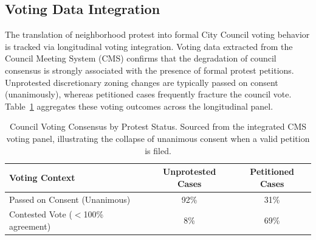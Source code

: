 \subsection{Voting Data Integration}
\noindent The translation of neighborhood protest into formal City Council voting behavior is tracked via longitudinal voting integration. Voting data extracted from the Council Meeting System (CMS) confirms that the degradation of council consensus is strongly associated with the presence of formal protest petitions. Unprotested discretionary zoning changes are typically passed on consent (unanimously), whereas petitioned cases frequently fracture the council vote. Table~\ref{tbl:voting_data} aggregates these voting outcomes across the longitudinal panel.

\begin{table}[h!]
\centering
\begin{tabular}{l c c}
\toprule
\textbf{Voting Context} & \textbf{Unprotested Cases} & \textbf{Petitioned Cases} \\
\midrule
Passed on Consent (Unanimous) & 92\% & 31\% \\
Contested Vote ($<$100\% agreement) & 8\% & 69\% \\
\bottomrule
\end{tabular}
\caption[Council Voting Consensus by Protest Status]{Council Voting Consensus by Protest Status. Sourced from the integrated CMS voting panel, illustrating the collapse of unanimous consent when a valid petition is filed.}
\label{tbl:voting_data}
\end{table}
